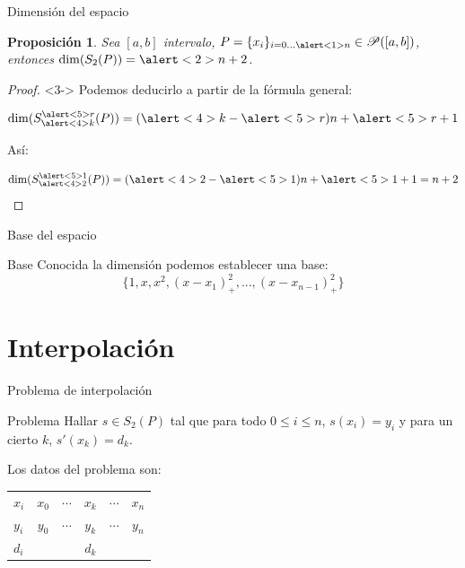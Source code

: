 \documentclass[compress]{beamer}
\newtheorem*{proposicion}{Proposición}
\theoremstyle{definition}
\begin{document}
\begin{frame}{Dimensión del espacio}
\begin{proposicion}
Sea $[a,b]$ intervalo, $P = \{x_i\}_{i=0...\alert<1>{n}} \in \mathscr{P}([a,b])$,
entonces $\dim(S_2(P)) = \alert<2>{n+2}$.
\end{proposicion}
\begin{proof}<3->
Podemos deducirlo a partir de la fórmula general:

\[
\dim(S_{\alert<4>{k}}^{\alert<5>{r}}(P)) = (\alert<4>{k} - \alert<5>{r})n
+ \alert<5>{r} + 1
\]

Así:

\[\dim(S_{\alert<4>{2}}^{\alert<5>{1}}(P)) = (\alert<4>{2} - \alert<5>{1})n + \alert<5>{1} + 1 = n + 2\]
\end{proof}
\end{frame}

\begin{frame}{Base del espacio}
\begin{block}{Base}
Conocida la dimensión podemos establecer una base:
\[\{1, x, x^2, (x-x_1)_+^2, ... , (x-x_{n-1})_+^2\}\]
\end{block}
\end{frame}

\section{Interpolación}

\begin{frame}{Problema de interpolación}
\begin{exampleblock}{Problema}
Hallar $s \in S_2(P)$ tal que para todo $0 \leq i \leq n$, $s(x_i) = y_i$ y
para un cierto $k$, $s'(x_k) = d_k$.
\end{exampleblock}

\vfill

Los datos del problema son:
\begin{table}[h]
\centering
\begin{tabular}{l|ccccc}
$x_i$ & $x_0$ & $\cdots$ & $x_k$ & $\cdots$ & $x_n$ \\
$y_i$ & $y_0$ & $\cdots$ & $y_k$ & $\cdots$ & $y_n$ \\
$d_i$ & &  & $d_k$ &  &
\end{tabular}
\end{table}
\end{frame}
\end{document}
